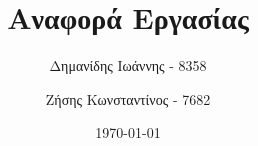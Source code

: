 

\subject{Ευφυή Συστήματα Ρομπότ}
\title{Αναφορά Εργασίας}
\author{%
	Δημανίδης Ιωάννης - 8358
  \and Ζήσης Κωνσταντίνος - 7682
}
\date{\vspace{10cm}\today}


	\pagestyle{empty}

	\maketitle

	\clearpage


	\clearpage
	\pagestyle{scrheadings}
	\setcounter{page}{1}

	
	
	
	
	


